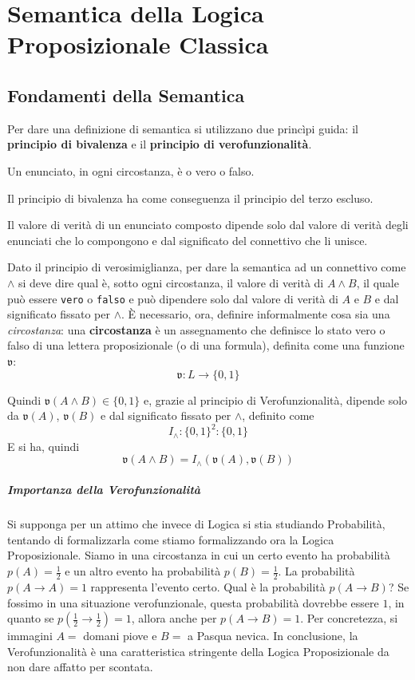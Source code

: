 \chapter{Semantica della Logica Proposizionale Classica}
\section{Fondamenti della Semantica}
Per dare una definizione di semantica si utilizzano due princìpi guida: il 
\textbf{principio di bivalenza} e il \textbf{principio di verofunzionalità}. 

\begin{pri}[Bivalenza]
Un enunciato, in ogni circostanza, è o vero o falso.
\end{pri}

Il principio di bivalenza ha come conseguenza il principio del terzo escluso. 

\begin{pri}
Il valore di verità di un enunciato composto dipende solo dal valore di verità 
degli enunciati che lo compongono e dal significato del connettivo che li unisce. 
\end{pri}

Dato il principio di verosimiglianza, per dare la semantica ad un connettivo come $\land$
si deve dire qual è, sotto ogni circostanza, il valore di verità di $A \land B$, 
il quale può essere \texttt{vero} o \texttt{falso} e può dipendere solo dal valore 
di verità di $A$ e $B$ e dal significato fissato per $\land$. 
\`E necessario, ora, definire informalmente cosa sia una \textit{circostanza}: 
una \textbf{circostanza} è un assegnamento che definisce lo stato vero 
o falso di una lettera proposizionale (o di una formula), definita come 
una funzione $\mathfrak{v}$:
$$
\mathfrak{v} : L \rightarrow \{0,1\}
$$

Quindi $\mathfrak{v}(A \land B) \in \{0,1\}$ e, grazie al principio di Verofunzionalità, 
dipende solo da $\mathfrak{v}(A)$, 
$\mathfrak{v}(B)$ e dal significato fissato per $\land$, definito come 
$$
I_{\land}: \{0,1\}^2 : \{0,1\}
$$
E si ha, quindi
$$
\mathfrak{v}(A \land B ) = I_{\land} (\mathfrak{v}(A), \mathfrak{v}(B))
$$
\paragraph{Importanza della Verofunzionalità}
Si supponga per un attimo che invece di Logica si stia studiando Probabilità, 
tentando di formalizzarla come stiamo formalizzando ora la Logica Proposizionale. 
Siamo in una circostanza in cui un certo evento ha probabilità
$p(A) = \frac{1}{2}$ e un altro evento ha probabilità $p(B) = \frac{1}{2}$. 
La probabilità $p(A \rightarrow A) = 1$ rappresenta l'evento certo. 
Qual è la probabilità $p(A \rightarrow B)$? Se fossimo in una situazione verofunzionale, 
questa probabilità dovrebbe essere $1$, in quanto se $p(\frac{1}{2} \rightarrow \frac{1}{2}) = 1$, 
allora anche per $p(A \rightarrow B) = 1$. Per concretezza, si immagini 
$A = $ domani piove e $B = $ a Pasqua nevica.  In conclusione, la 
Verofunzionalità è una caratteristica stringente della Logica Proposizionale 
da non dare affatto per scontata. 

